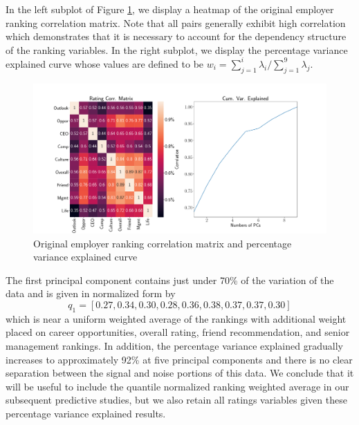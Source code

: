 \documentclass[10pt]{article}
\begin{document}
In the left subplot of Figure \ref{fig:pcagr}, we display a heatmap of the 
original employer ranking correlation matrix.  Note that all pairs 
generally exhibit high correlation which demonstrates 
that it is necessary to account for the dependency structure of the ranking 
variables.  In the right subplot, we display the percentage variance explained curve 
whose values are defined to be $w_i = \sum_{j=1}^i\lambda_i/\sum_{j=1}^9\lambda_j$. 
%
\begin{figure}[thb]
    \centering
	\includegraphics[width=1.0\linewidth]{pcagr.pdf}
	\caption{Original employer ranking correlation matrix and percentage variance 
    explained curve}
	\label{fig:pcagr}
\end{figure}
%
The first principal component contains just under 70\% of the variation of the data 
and is given in normalized form by  
%
\begin{equation}
    q_1 = [0.27,0.34,0.30,0.28,0.36,0.38,0.37,0.37,0.30] 
\end{equation}
%
which is near a uniform weighted average of the rankings with additional 
weight placed on career opportunities, overall rating, friend recommendation, and 
senior management rankings. In addition, the percentage variance explained 
gradually increases to approximately 92\% at five principal components and 
there is no clear separation between the signal and noise portions of this data.
We conclude that it will be useful to include the quantile normalized 
ranking weighted average in our subsequent predictive studies, but we 
also retain all ratings variables given these percentage variance explained results. 
\end{document}
